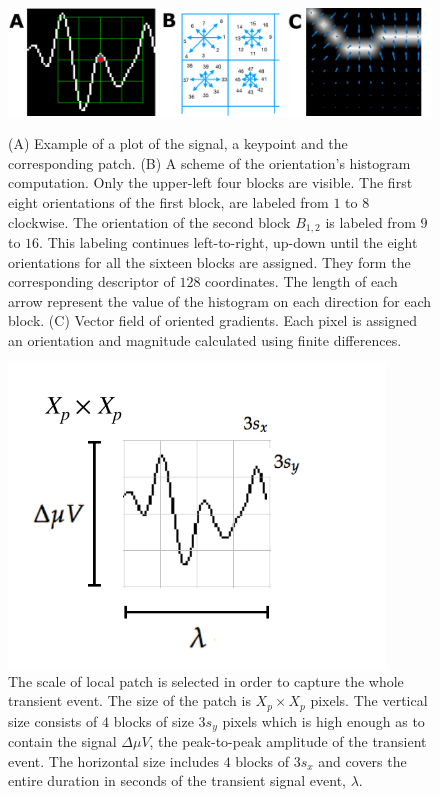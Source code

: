 \documentclass[utf8]{frontiersSCNS} %
\begin{document}
\begin{figure}[h!]
\centering
\includegraphics[width=16cm]{gradients.png}\label{samplegradients}
\caption{ (A) Example of a plot of the signal, a keypoint and the corresponding patch. (B) A scheme of the orientation's histogram computation.  Only the upper-left four blocks are visible.  The first eight orientations of the first block, are labeled from $1$ to $8$ clockwise. The orientation of the second block $ B_{1,2} $ is labeled from $9$ to $16$.  This labeling continues left-to-right, up-down until the eight orientations for all the sixteen blocks are assigned. They form the corresponding descriptor of $128$ coordinates.  The length of each arrow represent the value of the histogram on each direction for each block. (C) Vector field of oriented gradients.  Each pixel is assigned an orientation and magnitude calculated  using finite differences. }
\label{fig:sampledescriptor}
\end{figure}

\begin{figure}[h!]
\centering
\includegraphics[width=10cm]{patchgeometry.pdf}
\caption{The scale of local patch is selected in order to capture the whole transient event.  The size of the patch is $X_p \times X_p$ pixels. The vertical size consists of $4$ blocks of size $3 s_y$ pixels which is high enough as to contain the signal $\Delta  \mu V $, the peak-to-peak amplitude of the transient event. The horizontal size includes $4$ blocks  of $3 s_x$ and covers the entire duration in seconds of the transient signal event, $ \lambda $.   }
\label{fig:patchgeometry}
\end{figure}
\end{document}

